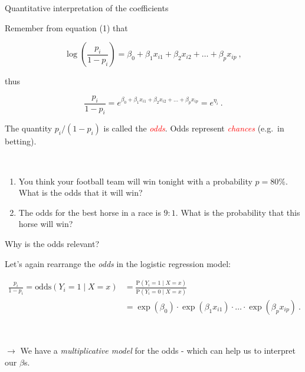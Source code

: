 \documentclass[10pt,ignorenonframetext,]{beamer}
\begin{document}
\begin{frame}

\begin{block}{Quantitative interpretation of the coefficients}

\vspace{2mm} Remember from equation (1) that

\begin{equation*}
\log\left( \frac{p_i}{1-p_i} \right) = \beta_0 + \beta_1 x_{i1} + \beta_2 x_{i2} + \ldots + \beta_p x_{ip} \ ,
\end{equation*}

thus

\begin{equation*}
 \frac{p_i}{1-p_i} = e^{\beta_0 + \beta_1 x_{i1} + \beta_2 x_{i2} + \ldots + \beta_p x_{ip}} = e^{\eta_i} \ .
\end{equation*}

\vspace{2mm}

The quantity \(p_i/(1-p_i)\) is called the \emph{\textcolor{red}{odds}}.
Odds represent \emph{\textcolor{red}{chances}} (e.g.~in betting).

\(~\)

\begin{enumerate}
\def\labelenumi{\arabic{enumi}.}
\item
  You think your football team will win tonight with a probability
  \(p=80\%\). What is the odds that it will win?
\item
  The odds for the best horse in a race is \(9:1\). What is the
  probability that this horse will win?
\end{enumerate}

\end{block}

\end{frame}

\begin{frame}

\begin{block}{Why is the odds relevant?}

\vspace{2mm} Let's again rearrange the \emph{odds} in the logistic
regression model:

\begin{align*}
 \frac{p_i}{1-p_i} = \text{odds}(Y_i=1 \mid X=x)  & = \frac{\text{P}(Y_i=1 \mid X=x)}{\text{P}(Y_i=0 \mid X = x)} \\
 &= \exp(\beta_0) \cdot \exp(\beta_1 x_{i1}) \cdot \ldots \cdot  \exp(\beta_p x_{ip}) \ .
 \end{align*}

\(~\)

\(\rightarrow\) We have a \emph{multiplicative model} for the odds -
which can help us to interpret our \(\beta\)s.

\end{block}

\end{frame}
\end{document}
